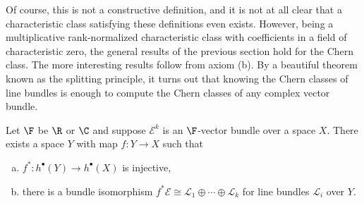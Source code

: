 Of course, this is not a constructive definition, and it is not at all clear that a characteristic class satisfying these definitions even exists.
However, being a multiplicative rank-normalized characteristic class with coefficients in a field of characteristic zero, the general results of the previous section hold for the Chern class. The more interesting results follow from axiom (b). By a beautiful theorem known as the splitting principle, it turns out that knowing the Chern classes of line bundles is enough to compute the Chern classes of any complex vector bundle.

\begin{theorem}
	Let $\F$ be $\R$ or $\C$ and suppose $\mathcal{E}^k$ is an $\F$-vector bundle over a space $X$. There exists a space $Y$ with map $f : Y \to X$ such that
	\begin{enumerate}[(a)]
		\item $f^* : h^\bullet(Y) \to h^\bullet(X)$ is injective,
		\item there is a bundle isomorphism $f^*\mathcal{E} \cong \mathcal{L}_1\oplus\cdots \oplus \mathcal{L}_k$ for line bundles $\mathcal{L}_i$ over $Y$.
	\end{enumerate}
\end{theorem}

